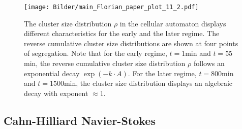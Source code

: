 \documentclass[10pt,letterpaper]{article}
\begin{document}
\begin{figure}[ht!]
 \centering
 \texttt{[image: Bilder/main\_Florian\_paper\_plot\_11\_2.pdf]}
 \caption{The cluster size distribution $\rho$ in the cellular automaton
   displays different characteristics for the early and the
   later regime. The reverse cumulative cluster size
   distributions are shown at four points of segregation. Note that for
   the early regime, $t=1$min and $t=55$min, the reverse cumulative cluster
   size distribution $\rho$ follows an exponential decay $\exp(-k\cdot A)$. For
   the later regime, $t=800$min and $t=1500$min, the cluster size
   distribution displays an algebraic decay with exponent $\approx 1$.}
 \label{fig:main_Florian_paper_plot_11_2}
\end{figure}

\subsection*{Cahn-Hilliard Navier-Stokes}
\end{document}
